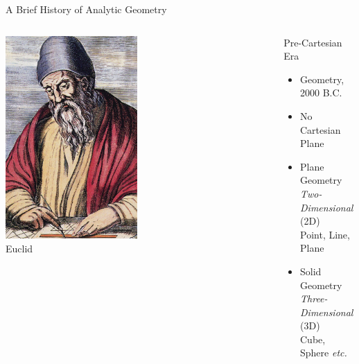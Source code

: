 \documentclass[14pt,aspectratio=169]{beamer}
\begin{document}
\begin{frame}{A Brief History of Analytic Geometry}
    \begin{columns}
    \centering
     \includegraphics[width=0.5\textwidth]{image01.png}\\
     Euclid

        \begin{block}{Pre-Cartesian Era}
            \vspace{1mm}
            \begin{itemize}
             \item Geometry, 2000 B.C.
             \item No Cartesian Plane
             \item Plane Geometry \\
                    \textit{Two-Dimensional} (2D) \\
                    Point, Line, Plane
            \item Solid Geometry \\
                \textit{Three-Dimensional} (3D) \\
                    Cube, Sphere \textit{etc.}
            \end{itemize}
            \vspace{1mm}

        \end{block}

    \end{columns}

\end{frame}
\end{document}
